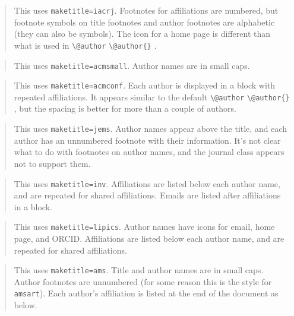 \documentclass{article}
\newcommand{\cmd}[2][]{%
  \def\FirstArg{#1}%
  \ifx\FirstArg\empty%
    \texttt{\textbackslash{}#2}%
  \else%
    \texttt{\textbackslash{}#2\{#1\}}%
  \fi
}
\begin{document}
\newpage
{}
\setcounter{footnote}{0}
\METAC@iacrj@maketitle
\begin{quote}
This uses \texttt{maketitle=iacrj}. Footnotes for affiliations are numbered, but footnote symbols on
title footnotes and author footnotes are alphabetic (they can also be symbols). The icon for a home page
is different than what is used in \cmd{@author}.
\end{quote}
\label{iacrj}

\newpage
{}
\setcounter{footnote}{0}
\METAC@acmsmall@maketitle
\begin{quote}
This uses \texttt{maketitle=acmsmall}. Author names are in small caps.
\end{quote}
\label{acmsmall}

\newpage
{}
\label{acmconf}
\setcounter{footnote}{0}
\savenotes
\METAC@acmconf@maketitle
\spewnotes
\begin{quote}
This uses \texttt{maketitle=acmconf}. Each author is displayed in a block with repeated affiliations.
It appears similar to the default \cmd{@author}, but the spacing is better for more than a couple of
authors.
\end{quote}

\newpage
{}
\label{jems}
\setcounter{footnote}{0}
\METAC@jems@maketitle
\begin{quote}
This uses \texttt{maketitle=jems}. Author names appear above the title, and each author has an unnumbered footnote with their
information. It's not clear what to do with footnotes on author names, and the journal class appears not to support
them.
\end{quote}

\newpage
{}
\label{inv}
\setcounter{footnote}{0}
\begin{savenotes}
\METAC@inv@maketitle
\end{savenotes}

\begin{quote}
This uses \texttt{maketitle=inv}. Affiliations are listed below each author name, and are repeated for shared
affiliations. Emails are listed after affiliations in a block.
\end{quote}

\newpage
{}
\label{lipics}
\setcounter{footnote}{0}
\METAC@lipics@maketitle
\begin{quote}
This uses \texttt{maketitle=lipics}. Author names have icons for email, home page, and ORCID.
Affiliations are listed below each author name, and are repeated for shared
affiliations.
\end{quote}

\newpage
{}
\label{ams}
\setcounter{footnote}{0}
\METAC@ams@maketitle
\begin{quote}
This uses \texttt{maketitle=ams}. Title and author names are in small caps.
Author footnotes are unnumbered (for some reason this is the style
for \texttt{amsart}). Each author's affiliation is listed at the end of the document as below.
\end{quote}

\makeatother
\end{document}
